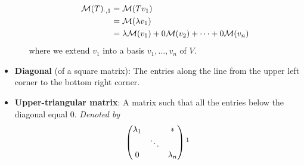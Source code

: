 \documentclass[../main.tex]{subfiles}
\begin{document}
\begin{itemize}
\begin{itemize}
        \begin{align*}
            \mathcal{M}(T)_{\cdot,1} &= \mathcal{M}(Tv_1)\\
            &= \mathcal{M}(\lambda v_1)\\
            &= \lambda\mathcal{M}(v_1)+0\mathcal{M}(v_2)+\cdots+0\mathcal{M}(v_n)
        \end{align*}
        where we extend $v_1$ into a basis $v_1,\dots,v_n$ of $V$.
    \end{itemize}
    \item \textbf{Diagonal} (of a square matrix): The entries along the line from the upper left corner to the bottom right corner.
    \item \textbf{Upper-triangular matrix}: A matrix such that all the entries below the diagonal equal 0. \emph{Denoted by}
    \begin{equation*}
        \begin{pmatrix}
            \lambda_1 &  & *\\
             & \ddots & \\
            0 &  & \lambda_n\\
        \end{pmatrix}\footnotemark
    \end{equation*}
\end{itemize}
\end{document}
